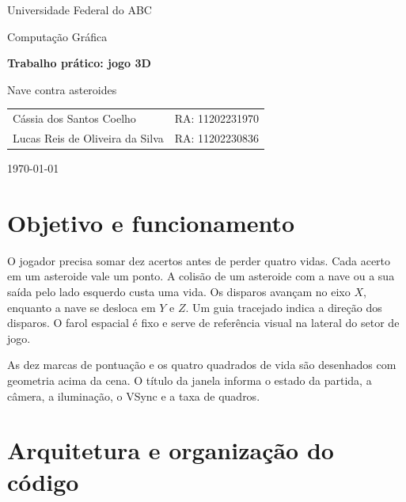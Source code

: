 \documentclass[12pt,a4paper]{article}
\begin{document}
\hypersetup{pageanchor=false}
\begin{titlepage}
\centering
{\Large Universidade Federal do ABC\par}
\vspace{1.0cm}
{\large Computação Gráfica\par}
\vspace{3.0cm}
{\LARGE\bfseries Trabalho prático: jogo 3D\par}
\vspace{0.45cm}
{\Large Nave contra asteroides\par}
\vfill
\begin{tabular}{ll}
Cássia dos Santos Coelho & RA: 11202231970\\
Lucas Reis de Oliveira da Silva & RA: 11202230836\\
\end{tabular}
\vfill
{\large \today\par}
\end{titlepage}
\hypersetup{pageanchor=true}

\begin{abstract}
Este trabalho estende o jogo 2D de nave e asteroides para uma cena tridimensional. A nave se move na vertical e na lateral para alinhar disparos com asteroides que se aproximam. A cena inclui duas câmeras em perspectiva, dois tipos de luz e dois objetos texturizados. O programa foi desenvolvido em Python com GLFW, ModernGL, NumPy, PyGLM e Pillow, com shaders GLSL próprios em OpenGL 4.0 Core.
\end{abstract}

\section{Objetivo e funcionamento}

O jogador precisa somar dez acertos antes de perder quatro vidas. Cada acerto em um asteroide vale um ponto. A colisão de um asteroide com a nave ou a sua saída pelo lado esquerdo custa uma vida. Os disparos avançam no eixo $X$, enquanto a nave se desloca em $Y$ e $Z$. Um guia tracejado indica a direção dos disparos. O farol espacial é fixo e serve de referência visual na lateral do setor de jogo.

As dez marcas de pontuação e os quatro quadrados de vida são desenhados com geometria acima da cena. O título da janela informa o estado da partida, a câmera, a iluminação, o VSync e a taxa de quadros.

\section{Arquitetura e organização do código}
\end{document}
